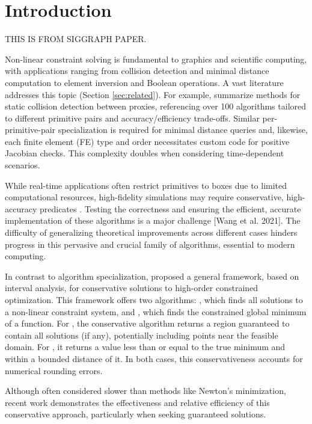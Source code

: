 
\section{Introduction}
\label{sec:introduction}

THIS IS FROM SIGGRAPH PAPER.

Non-linear constraint solving is fundamental to graphics and scientific computing, with applications ranging from collision detection and minimal distance computation to element inversion and Boolean operations. A vast literature addresses this topic (Section \ref{sec:related}). For example, \cite{RTR4,Akenine2024} summarize methods for static collision detection between proxies, referencing over 100 algorithms tailored to different primitive pairs and accuracy/efficiency trade-offs.
Similar per-primitive-pair specialization is required for minimal distance queries and, likewise, each finite element (FE) type and order necessitates custom code for positive Jacobian checks.
This complexity doubles when considering time-dependent scenarios.

While real-time applications often restrict primitives to boxes due to limited computational resources, high-fidelity simulations may require conservative, high-accuracy predicates \cite{snyder92}.
Testing the correctness and ensuring the efficient, accurate implementation of these algorithms is a major challenge [Wang et al. 2021]. The difficulty of generalizing theoretical improvements across different cases hinders progress in this pervasive and crucial family of algorithms, essential to modern computing.

In contrast to algorithm specialization, \citet{snyder92} proposed a general framework, based on interval analysis, for conservative solutions to high-order constrained optimization. This framework offers two algorithms: \solve, which finds all solutions to a non-linear constraint system, and \minimize, which finds the constrained global minimum of a function. For \solve, the conservative algorithm returns a region guaranteed to contain all solutions (if any), potentially including points near the feasible domain. For \minimize, it returns a value less than or equal to the true minimum and within a bounded distance of it. In both cases, this conservativeness accounts for numerical rounding errors.

Although often considered slower than methods like Newton's minimization, recent work \cite{Wang2021,Chen2024} 
 demonstrates the effectiveness and relative efficiency of this conservative approach, particularly when seeking guaranteed solutions. 

